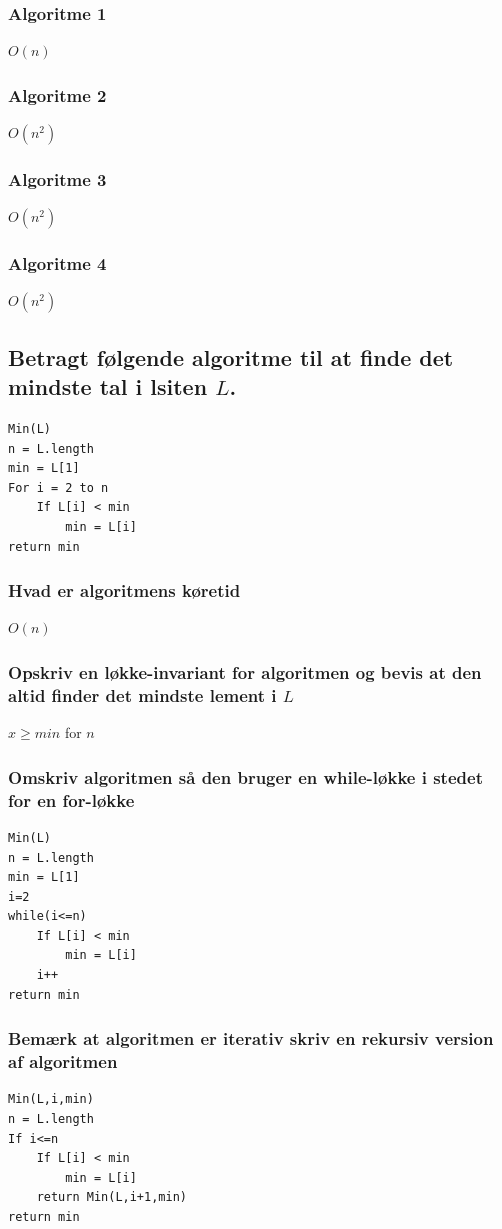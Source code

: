 \documentclass[12pt, a4paper]{article}
\begin{document}
			\subsubsection{Algoritme 1}
				$O(n)$
			\subsubsection{Algoritme 2}
				$O(n^2)$
			\subsubsection{Algoritme 3}
				$O(n^2)$
			\subsubsection{Algoritme 4}
				$O(n^2)$
		\subsection{Betragt følgende algoritme til at finde det mindste tal i lsiten $L$.}
			\begin{lstlisting}
Min(L)
n = L.length
min = L[1]
For i = 2 to n
	If L[i] < min
		min = L[i]
return min
			\end{lstlisting}
			\subsubsection{Hvad er algoritmens køretid}
				$O(n)$
			\subsubsection{Opskriv en løkke-invariant for algoritmen og bevis at den altid finder det mindste lement i $L$}
				$x\geq min$ for $n$
			\subsubsection{Omskriv algoritmen så den bruger en while-løkke i stedet for en for-løkke}
				\begin{lstlisting}
Min(L)
n = L.length
min = L[1]
i=2
while(i<=n)
	If L[i] < min
		min = L[i]
	i++
return min
			\end{lstlisting}
			\subsubsection{Bemærk at algoritmen er iterativ skriv en rekursiv version af algoritmen}
			\begin{lstlisting}
Min(L,i,min)
n = L.length
If i<=n
	If L[i] < min
		min = L[i]
	return Min(L,i+1,min)
return min
			\end{lstlisting}
		\setcounter{subsection}{0}
\end{document}
